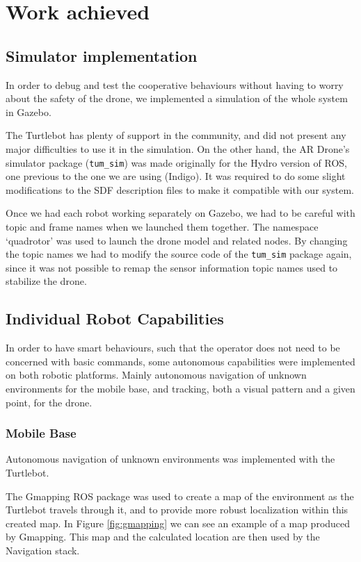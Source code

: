 \documentclass[11pt,a4paper,twocolumn]{article}
\begin{document}
\section{Work achieved}

\subsection{Simulator implementation}
In order to debug and test the cooperative behaviours without having to worry about the safety of the drone, we implemented a simulation of the whole system in Gazebo.

The Turtlebot has plenty of support in the community, and did not present any major difficulties to use it in the simulation. On the other hand, the AR Drone's simulator package (\verb!tum_sim!) was made originally for the Hydro version of ROS, one previous to the one we are using (Indigo). It was required to do some slight modifications to the SDF description files to make it compatible with our system.

Once we had each robot working separately on Gazebo, we had to be careful with topic and frame names when we launched them together. The namespace `quadrotor' was used to launch the drone model and related nodes. By changing the topic names we had to modify the source code of the \verb!tum_sim! package again, since it was not possible to remap the sensor information topic names used to stabilize the drone.

\subsection{Individual Robot Capabilities}
In order to have smart behaviours, such that the operator does not need to be concerned with basic commands, some autonomous capabilities were implemented on both robotic platforms. Mainly autonomous navigation of unknown environments for the mobile base, and tracking, both a visual pattern and a given point, for the drone.

\subsubsection{Mobile Base}
Autonomous navigation of unknown environments was implemented with the Turtlebot.

The Gmapping ROS package was used to create a map of the environment as the Turtlebot travels through it, and to provide more robust localization within this created map. In Figure \ref{fig:gmapping} we can see an example of a map produced by Gmapping. This map and the calculated location are then used by the Navigation stack.
\end{document}
